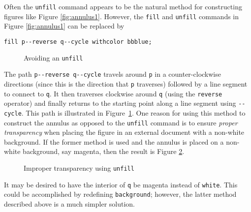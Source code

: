 Often the \texttt{unfill} command appears to be the natural method for constructing figures like Figure \ref{fig:annulus1}.  However, the \texttt{fill} and \texttt{unfill} commands in Figure \ref{fig:annulus1} can be replaced by \begin{center}\verb|fill p--reverse q--cycle withcolor bbblue;|\end{center}
\begin{figure}[hptb]
	\begin{center}\end{center}
	\caption{Avoiding an \texttt{unfill}}\label{fig:annulus2}
\end{figure}
The path \verb|p--reverse q--cycle| travels around \texttt{p} in a counter-clockwise directions (since this is the direction that \texttt{p} traverses) followed by a line segment to connect to \texttt{q}.  It then traverses clockwise around \texttt{q} (using the \texttt{reverse} operator) and finally returns to the starting point along a line segment using \texttt{-{}-cycle}.  This path is illustrated in Figure~\ref{fig:annulus2}.  One reason for using this method to construct the annulus as opposed to the \texttt{unfill} command is to ensure \textit{proper transparency} when placing the figure in an external document with a non-white background.  If the former method is used and the annulus is placed on a non-white background, say magenta, then the result is Figure \ref{fig:annulus3}.
\begin{figure}[ht]
	\begin{center}\end{center}
	\caption{Improper transparency using \texttt{unfill}}\label{fig:annulus3}
\end{figure}
It may be desired to have the interior of \texttt{q} be magenta instead of \texttt{white}.  This could be accomplished by redefining \texttt{background}; however, the latter method described above is a much simpler solution.
